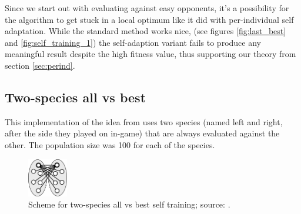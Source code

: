 \documentclass[11pt,a4paper]{scrartcl}
\begin{document}
Since we start out with evaluating against easy opponents, it's a possibility for the algorithm to get stuck in a local optimum like it did with per-individual self adaptation. While the standard method works nice, (see figures \ref{fig:last_best} and \ref{fig:self_training_1}) the self-adaption variant fails to produce any meaningful result despite the high fitness value, thus supporting our theory from section \ref{sec:perind}.

\subsection{Two-species all vs best}

This implementation of the idea from \cite{Sims94evolving3d} uses two species (named left and right, after the side they played on in-game) that are always evaluated against the other. The population size was 100 for each of the species.

\begin{figure}[H]
\center
\includegraphics[width=0.155555\textwidth]{img/scheme_self_training_2.png}
\caption{Scheme for two-species all vs best self training; source: \cite{Sims94evolving3d}.}
\label{fig:scheme_self_training_2}
\end{figure}
\end{document}
